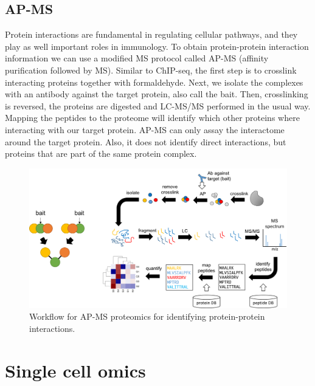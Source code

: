 \documentclass[]{book}
\theoremstyle{definition}
\theoremstyle{definition}
\theoremstyle{definition}
\theoremstyle{remark}
\begin{document}
\subsection{AP-MS}\label{ap-ms}

Protein interactions are fundamental in regulating cellular pathways,
and they play as well important roles in immunology. To obtain
protein-protein interaction information we can use a modified MS
protocol called AP-MS (affinity purification followed by MS). Similar to
ChIP-seq, the first step is to crosslink interacting proteins together
with formaldehyde. Next, we isolate the complexes with an antibody
against the target protein, also call the bait. Then, crosslinking is
reversed, the proteins are digested and LC-MS/MS performed in the usual
way. Mapping the peptides to the proteome will identify which other
proteins where interacting with our target protein. AP-MS can only assay
the interactome around the target protein. Also, it does not identify
direct interactions, but proteins that are part of the same protein
complex.

\begin{figure}
\includegraphics[width=22.72in]{pic/ap-ms} \caption{Workflow for AP-MS proteomics for identifying protein-protein interactions.}\label{fig:ap-ms}
\end{figure}

\section{Single cell omics}\label{single-cell-omics}
\end{document}
